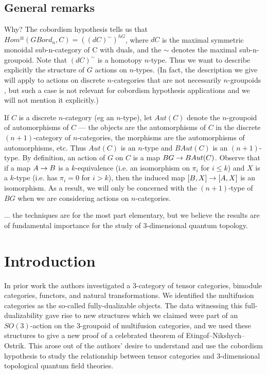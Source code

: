 \documentclass{amsart}
\begin{document}
\subsection{General remarks}

Why? The cobordism hypothesis tells us that $Hom^{\otimes}(GBord_n,C) = ((dC)^{\sim})^{hG}$, where $dC$ is the maximal symmetric monoidal sub-n-category of C with duals, and the $\sim$ denotes the maximal sub-n-groupoid.  Note that $(dC)^\sim$ is a homotopy $n$-type.  Thus we want to describe explicitly the structure of $G$ actions on $n$-types.  (In fact, the description we give will apply to actions on discrete $n$-categories that are not necessarily $n$-groupoids , but such a case is not relevant for cobordism hypothesis applications and we will not mention it explicitly.)

If $C$ is a discrete $n$-category (eg an $n$-type), let $Aut(C)$ denote the $n$-groupoid of automorphisms of $C$ --- the objects are the automorphisms of $C$ in the discrete $(n+1)$-category of $n$-categories, the morphisms are the automorphisms of automorphisms, etc.  Thus $Aut(C)$ is an $n$-type and $BAut(C)$ is an $(n+1)$-type.  By definition, an action of $G$ on $C$ is a map $BG \rightarrow BAut(C)$.  Observe that if a map $A \rightarrow B$ is a $k$-equivalence (i.e. an isomorphism on $\pi_i$ for $i \leq k$) and $X$ is a $k$-type (i.e. has $\pi_i = 0$ for $i > k$), then the induced map $[B,X] \rightarrow [A,X]$ is an isomorphism.  As a result, we will only be concerned with the $(n+1)$-type of $BG$ when we are considering actions on $n$-categories.

... the techniques are for the most part elementary, but we believe the results are of fundamental importance for the study of 3-dimensional quantum topology.


\section{Introduction}

In prior work the authors investigated a 3-category of tensor categories, bimodule categories, functors, and natural transformations. We identified the multifusion categories as the so-called fully-dualizable objects. The data witnessing this full-dualizability gave rise to new structures which we claimed were part of an $SO(3)$-action on the 3-groupoid of multifusion categories, and we used these structures to give a new proof of a celebrated theorem of Etingof--Nikshych--Ostrik. This arose out of the authors' desire to understand and use the cobordism hypothesis to study the relationship between tensor categories and 3-dimensional topological quantum field theories. 
\end{document}
